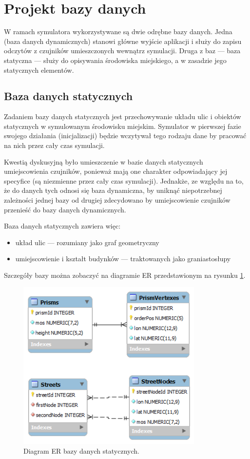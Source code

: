 {\section[Projekt bazy danych][Projekt bazy danych]{Projekt bazy danych}
\par{
W ramach symulatora wykorzystywane są dwie odrębne bazy danych. Jedna (baza danych dynamicznych) stanowi główne wyjście aplikacji i służy do zapisu odczytów z czujników umieszczonych wewnątrz symulacji. Druga z baz --- baza statyczna --- służy do opisywania środowiska miejskiego, a w zasadzie jego statycznych elementów.
}

\subsection{Baza danych statycznych}
\par{
Zadaniem bazy danych statycznych jest przechowywanie układu ulic i obiektów statycznych w symulowanym środowisku miejskim. Symulator w pierwszej fazie swojego działania (inicjalizacji) będzie wczytywał tego rodzaju dane by pracować na nich przez cały czas symulacji.
}
\par{
Kwestią dyskusyjną było umieszczenie w bazie danych statycznych umiejscowienia czujników, ponieważ mają one charakter odpowiadający jej specyfice (są niezmienne przez cały czas symulacji). Jednakże, ze względu na to, że do danych tych odnosi się baza dynamiczna, by uniknąć niepotrzebnej zależności jednej bazy od drugiej zdecydowano by umiejscowienie czujników przenieść do bazy danych dynamicznych.
}
\par{
Baza danych statycznych zawiera więc:
\begin{itemize}
\item układ ulic --- rozumiany jako graf geometryczny
\item umiejscowienie i kształt budynków --- traktowanych jako graniastosłupy
\end{itemize}
Szczegóły bazy można zobaczyć na diagramie ER przedstawionym na rysunku \ref{static_db}.
}
\begin{figure}[htb]
    \begin{center}
	\includegraphics[width=25em]{img/static_db}
	\caption{Diagram ER bazy danych statycznych.}
	\label{static_db}
    \end{center}
\end{figure}

}
